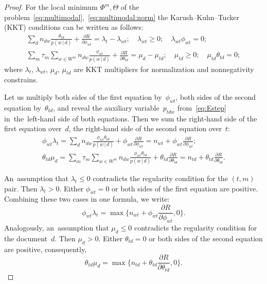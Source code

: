 \documentclass[russian]{llncs}
\newcommand{\cond}{\mspace{3mu}{|}\mspace{3mu}}
\begin{document}
\begin{proof}
    For the local minimum $\Phi^m,\Theta$
    of the problem~\eqref{eq:multimodal},~\eqref{eq:multimodal:norm}
    the Karush--Kuhn--Tucker (KKT) conditions can be written as follows:
    \begin{gather*}
        \sum_{d} n_{dw} \frac{\theta_{td}}{p(w\cond d)} + \frac{\partial R}{\partial \phi_{wt}}
        = \lambda_t - \lambda_{wt};
        \quad
        \lambda_{wt}\geq 0;
        \quad
        \lambda_{wt}\phi_{wt} = 0;
    \\
        \sum_{m} \tau_m \!\!\sum_{w\in W^m}\!\! n_{dw} \frac{\phi_{wt}}{p(w\cond d)} + \frac{\partial R}{\partial \theta_{td}}
        = \mu_d - \mu_{td};
        \quad
        \mu_{td}\geq 0;
        \quad
        \mu_{td}\theta_{td} = 0;
    \end{gather*}
    where $\lambda_t$, $\lambda_{wt}$, $\mu_d$, $\mu_{td}$
    are KKT multipliers for normalization and nonnegativity constrains.

    Let us multiply
    both sides of the first equation by~$\phi_{wt}$,
    both sides of the second equation by~$\theta_{td}$,
    and reveal the auxiliary variable~$p_{tdw}$ from~\eqref{eq:Estep}
    in~the~left-hand side of both equations.
    Then we sum
    the right-hand side of the first equation over~$d$,
    the right-hand side of the second equation over~$t$:
    \begin{gather*}
        \phi_{wt} \lambda_t
        =
        \sum_{d}
        n_{dw} \frac{\phi_{wt}\theta_{td}}{p(w\cond d)}
        + \phi_{wt} \frac{\partial R}{\partial \phi_{wt}}
        =
        n_{wt} + \phi_{wt} \frac{\partial R}{\partial \phi_{wt}};
    \\
        \theta_{td} \mu_{d}
        =
        \sum_{m} \tau_m \!\!\sum_{w\in W^m}\!\!
        n_{dw} \frac{\phi_{wt}\theta_{td}}{p(w\cond d)}
        + \theta_{td} \frac{\partial R}{\partial \theta_{td}}
        =
        n_{td} + \theta_{td} \frac{\partial R}{\partial \theta_{td}}.
    \end{gather*}

    An~assumption that $\lambda_t\leq 0$ contradicts the regularity condition for the $(t,m)$ pair.
    Then ${\lambda_t>0}$.
    Either ${\phi_{wt}= 0}$ or both sides of the first equation are positive.
    Combining these two cases in one formula, we write:
    \begin{equation}
    \label{eq:in-theorem-1:phi}
        \phi_{wt} \lambda_t
        =
        \max\biggl\{
        n_{wt} + \phi_{wt} \frac{\partial R}{\partial \phi_{wt}}, 0
        \biggr\}.
    \end{equation}
    Analogously,
    an~assumption that $\mu_d\leq 0$ contradicts the regularity condition for the document~$d$.
    Then ${\mu_d>0}$.
    Either ${\theta_{td}= 0}$ or both sides of the second equation are positive,
    consequently,
    \begin{equation}
    \label{eq:in-theorem-1:theta}
        \theta_{td} \mu_d
        =
        \max\biggl\{
        n_{td} + \theta_{td} \frac{\partial R}{\partial \theta_{td}}, 0
        \biggr\}.
    \end{equation}


\end{proof}
\end{document}
